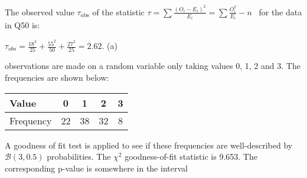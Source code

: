 \documentclass[bigtut]{tutorial}
\begin{document}
\begin{tutorial}
\begin{questions}
\question
The observed value $\tau_{\text{obs}}$ of the statistic $\tau = \sum \frac{(O_i -
E_i)^2}{E_i} = \sum \frac{O_{i}^2}{E_i} - n $ \  for the data in Q50
is:

\begin{solution}
 $\tau_{obs} = \frac{18^2}{25} + \frac{55^2}{50} + \frac{27^2}{25} = 2.62$. (a)
\end{solution}




 observations are made on a random variable only taking values 0,
1, 2 and 3. The frequencies are shown below:
\begin{center}
\begin{tabular}[ ]{|l||c|c|c|c|}\hline
Value & 0 & 1 & 2 & 3\\\hline Frequency & 22 & 38 & 32 & 8\\\hline
\end{tabular}
\end{center}
A goodness of fit test is applied to see if these frequencies are
well-described by $\mathcal B(3,0.5)$ probabilities. The $\chi^2$
goodness-of-fit statistic is 9.653. The corresponding p-value is
somewhere in the interval %
\end{questions}
\end{tutorial}
\end{document}
